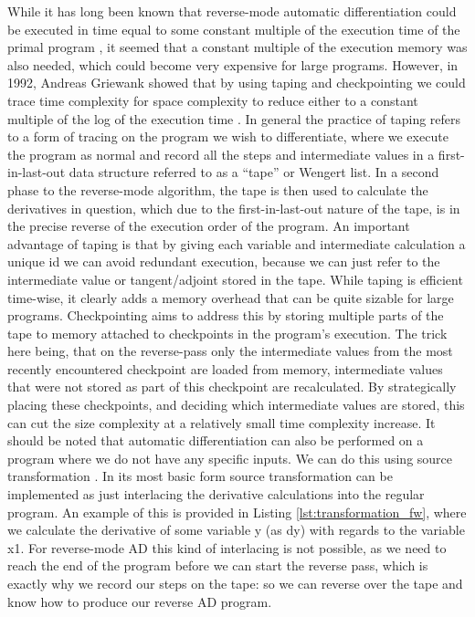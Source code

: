         While it has long been known that reverse-mode automatic differentiation could be executed in time equal to some constant multiple of the execution time of the primal program \cite{linnainmaa1976taylor}, it seemed that a constant multiple of the execution memory was also needed, which could become very expensive for large programs.
        However, in 1992, Andreas Griewank showed that by using taping and checkpointing we could trace time complexity for space complexity to reduce either to a constant multiple of the log of the execution time \cite{griewank1992achieving}.
        In general the practice of taping refers to a form of tracing on the program we wish to differentiate, where we execute the program as normal and record all the steps and intermediate values in a first-in-last-out data structure referred to as a ``tape'' or Wengert list.
        In a second phase to the reverse-mode algorithm, the tape is then used to calculate the derivatives in question, which due to the first-in-last-out nature of the tape, is in the precise reverse of the execution order of the program.
        An important advantage of taping is that by giving each variable and intermediate calculation a unique id we can avoid redundant execution, because we can just refer to the intermediate value or tangent/adjoint stored in the tape.
        While taping is efficient time-wise, it clearly adds a memory overhead that can be quite sizable for large programs.
        Checkpointing aims to address this by storing multiple parts of the tape to memory attached to checkpoints in the program's execution.
        The trick here being, that on the reverse-pass only the intermediate values from the most recently encountered checkpoint are loaded from memory, intermediate values that were not stored as part of this checkpoint are recalculated.
        By strategically placing these checkpoints, and deciding which intermediate values are stored, this can cut the size complexity at a relatively small time complexity increase.
        It should be noted that automatic differentiation can also be performed on a program where we do not have any specific inputs.
        We can do this using source transformation \cite{bischof2000computing}.
        In its most basic form source transformation can be implemented as just interlacing the derivative calculations into the regular program.
        An example of this is provided in Listing \ref{lst:transformation_fw}, where we calculate the derivative of some variable y (as dy) with regards to the variable x1.
        For reverse-mode AD this kind of interlacing is not possible, as we need to reach the end of the program before we can start the reverse pass, which is exactly why we record our steps on the tape: so we can reverse over the tape and know how to produce our reverse AD program.
